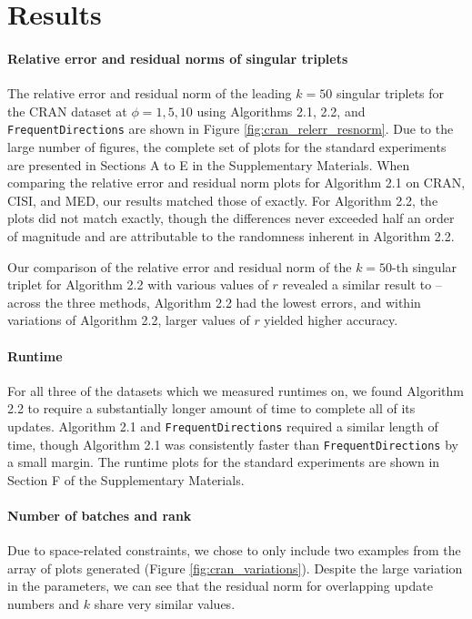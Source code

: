 \section{Results} \label{sec:results}

\paragraph{Relative error and residual norms of singular triplets}

The relative error and residual norm of the leading $k=50$ singular triplets for the CRAN dataset at $\phi=1,5,10$ using Algorithms 2.1, 2.2, and \verb|FrequentDirections| are shown in Figure \ref{fig:cran_relerr_resnorm}.
Due to the large number of figures, the complete set of plots for the standard experiments are presented in Sections A to E in the Supplementary Materials.
When comparing the relative error and residual norm plots for Algorithm 2.1 on CRAN, CISI, and MED, our results matched those of \cite{Kalantzis2021} exactly.
For Algorithm 2.2, the plots did not match exactly, though the differences never exceeded half an order of magnitude and are attributable to the randomness inherent in Algorithm 2.2. 



Our comparison of the relative error and residual norm of the $k=50$-th singular triplet for Algorithm 2.2 with various values of $r$ revealed a similar result to \cite{Kalantzis2021} – across the three methods, Algorithm 2.2 had the lowest errors, and within variations of Algorithm 2.2, larger values of $r$ yielded higher accuracy.



\paragraph{Runtime}

For all three of the datasets which we measured runtimes on, we found Algorithm 2.2 to require a substantially longer amount of time to complete all of its updates.
Algorithm 2.1 and \verb|FrequentDirections| required a similar length of time, though Algorithm 2.1 was consistently faster than \verb|FrequentDirections| by a small margin.
The runtime plots for the standard experiments are shown in Section F of the Supplementary Materials. 



\paragraph{Number of batches and rank} 

Due to space-related constraints, we chose to only include two examples from the array of plots generated (Figure \ref{fig:cran_variations}).
Despite the large variation in the parameters, we can see that the residual norm for overlapping update numbers and $k$ share very similar values.



